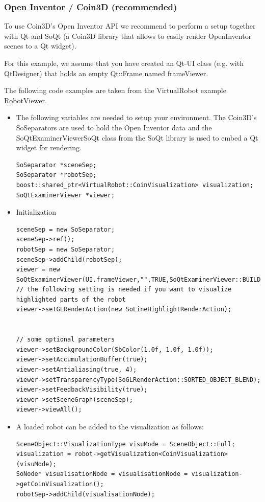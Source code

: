 \documentclass{book}
\begin{document}
\subsubsection{Open Inventor / Coin3D (recommended)}
To use Coin3D's Open Inventor API we recommend to perform a setup together with Qt and SoQt (a Coin3D library that allows to easily render OpenInventor scenes to a Qt widget).\par
For this example, we assume that you have created an Qt-UI class (e.g. with QtDesigner) that holds an empty Qt::Frame named frameViewer.\par
The following code examples are taken from the VirtualRobot example RobotViewer. 
\begin{itemize}
\item The following variables are needed to setup your environment. The Coin3D's SoSeparators are used to hold the Open Inventor data and the SoQtExaminerViewerSoQt class from the SoQt library is used to embed a Qt widget for rendering.
\begin{lstlisting}
SoSeparator *sceneSep;
SoSeparator *robotSep;
boost::shared_ptr<VirtualRobot::CoinVisualization> visualization;
SoQtExaminerViewer *viewer;
\end{lstlisting}
\item Initialization 
\begin{lstlisting}
sceneSep = new SoSeparator;
sceneSep->ref();
robotSep = new SoSeparator;
sceneSep->addChild(robotSep);
viewer = new SoQtExaminerViewer(UI.frameViewer,"",TRUE,SoQtExaminerViewer::BUILD_POPUP);
// the following setting is needed if you want to visualize highlighted parts of the robot
viewer->setGLRenderAction(new SoLineHighlightRenderAction);


// some optional parameters
viewer->setBackgroundColor(SbColor(1.0f, 1.0f, 1.0f));
viewer->setAccumulationBuffer(true);
viewer->setAntialiasing(true, 4);
viewer->setTransparencyType(SoGLRenderAction::SORTED_OBJECT_BLEND);
viewer->setFeedbackVisibility(true);
viewer->setSceneGraph(sceneSep);
viewer->viewAll();
\end{lstlisting}
\item A loaded robot can be added to the visualization as follows:
 \begin{lstlisting}
SceneObject::VisualizationType visuMode = SceneObject::Full;
visualization = robot->getVisualization<CoinVisualization>(visuMode);
SoNode* visualisationNode = visualisationNode = visualization->getCoinVisualization();
robotSep->addChild(visualisationNode);
\end{lstlisting}
\end{itemize}
\end{document}
